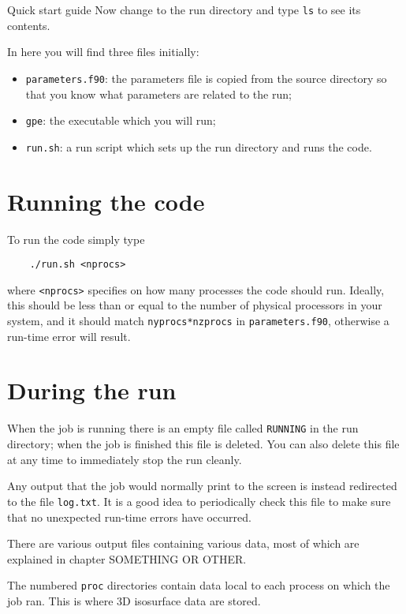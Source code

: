 \begin{chapter}{\label{cha:quickstart} Quick start guide}
  Now change to the run directory and type \verb"ls" to see its contents.

  In here you will find three files initially:
  \begin{itemize}
    \item \verb"parameters.f90": the parameters file is copied from the source
      directory so that you know what parameters are related to the run;
    \item \verb"gpe": the executable which you will run;
    \item \verb"run.sh": a run script which sets up the run directory and runs
      the code.
  \end{itemize}
  \section{Running the code}
  To run the code simply type
  \begin{Verbatim}
    ./run.sh <nprocs>
  \end{Verbatim}
  where \verb"<nprocs>" specifies on how many processes the code should run.
  Ideally, this should be less than or equal to the number of physical
  processors in your system, and it should match \verb"nyprocs*nzprocs" in
  \verb"parameters.f90", otherwise a run-time error will result.

  \section{During the run}
  When the job is running there is an empty file called \verb"RUNNING" in the
  run directory; when the job is finished this file is deleted.  You can also
  delete this file at any time to immediately stop the run cleanly.

  Any output that the job would normally print to the screen is instead
  redirected to the file \verb"log.txt".  It is a good idea to periodically
  check this file to make sure that no unexpected run-time errors have
  occurred.

  There are various output files containing various data, most of which are
  explained in chapter SOMETHING OR OTHER.

  The numbered \verb"proc" directories contain data local to each process on
  which the job ran.  This is where 3D isosurface data are stored.


\end{chapter}
